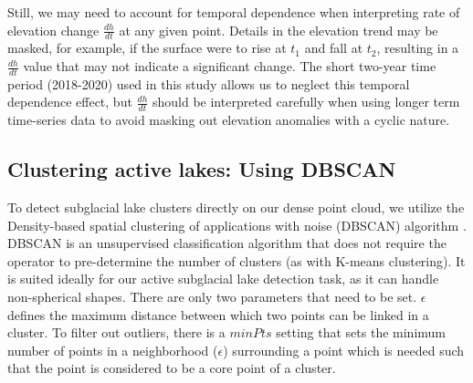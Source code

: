 Still, we may need to account for temporal dependence when interpreting rate of elevation change $\frac{dh}{dt}$ at any given point.
Details in the elevation trend may be masked, for example, if the surface were to rise at $t_1$ and fall at $t_2$, resulting in a $\frac{dh}{dt}$ value that may not indicate a significant change.
The short two-year time period (2018-2020) used in this study allows us to neglect this temporal dependence effect, but $\frac{dh}{dt}$ should be interpreted carefully when using longer term time-series data to avoid masking out elevation anomalies with a cyclic nature.


\subsection{Clustering active lakes: Using DBSCAN} \label{sec:dbscan}

To detect subglacial lake clusters directly on our dense point cloud, we utilize the Density-based spatial clustering of applications with noise (\gls{DBSCAN}) algorithm \citep{SchubertDBSCANRevisitedRevisited2017}.
\gls{DBSCAN} is an unsupervised classification algorithm that does not require the operator to pre-determine the number of clusters (as with K-means clustering).
It is suited ideally for our active subglacial lake detection task, as it can handle non-spherical shapes.
There are only two parameters that need to be set.
$\epsilon$ defines the maximum distance between which two points can be linked in a cluster.
To filter out outliers, there is a $minPts$ setting that sets the minimum number of points in a neighborhood ($\epsilon$) surrounding a point which is needed such that the point is considered to be a core point of a cluster.

